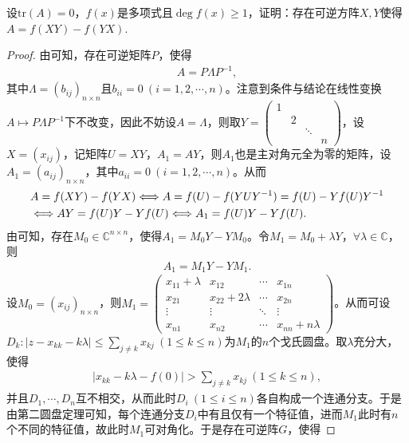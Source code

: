 \documentclass[../../main.tex]{subfiles}
\begin{document}
\begin{proposition}
设$\mathrm{tr}(A)=0$，$f(x)$是多项式且$\deg f(x)\geq 1$，证明：存在可逆方阵$X,Y$使得$A = f(XY)-f(YX)$.
\end{proposition}
\begin{proof}
由可知，存在可逆矩阵$P$，使得
\begin{align*}
A = P\Lambda P^{-1},
\end{align*}
其中$\Lambda = (b_{ij})_{n\times n}$且$b_{ii} = 0\ (i = 1,2,\cdots,n)$。注意到条件与结论在线性变换$A \mapsto P\Lambda P^{-1}$下不改变，因此不妨设$A = \Lambda$，则取$Y = \begin{pmatrix}
1 & & & \\
& 2 & & \\
& & \ddots & \\
& & & n
\end{pmatrix}$，设$X = (x_{ij})$，记矩阵$U = XY$，$A_1 = AY$，则$A_1$也是主对角元全为零的矩阵，设$A_1 = (a_{ij})_{n\times n}$，其中$a_{ii} = 0\ (i = 1,2,\cdots,n)$。从而
\begin{align}
&A = f(XY) - f(YX) \Longleftrightarrow A = f(U) - f(YUY^{-1}) = f(U) - Yf(U)Y^{-1} \notag \\
&\Longleftrightarrow AY = f(U)Y - Yf(U) \Longleftrightarrow A_1 = f(U)Y - Yf(U). \label{100.49}
\end{align}
由可知，存在$M_0 \in \mathbb{C}^{n\times n}$，使得$A_1 = M_0Y - YM_0$。令$M_1 = M_0 + \lambda Y$，$\forall \lambda \in \mathbb{C}$，则
\begin{align}
A_1 = M_1Y - YM_1. \label{100.48}
\end{align}
设$M_0 = (x_{ij})_{n\times n}$，则$M_1 = \begin{pmatrix}
x_{11} + \lambda & x_{12} & \cdots & x_{1n} \\
x_{21} & x_{22} + 2\lambda & \cdots & x_{2n} \\
\vdots & \vdots & \ddots & \vdots \\
x_{n1} & x_{n2} & \cdots & x_{nn} + n\lambda
\end{pmatrix}$。从而可设$D_k: |z - x_{kk} - k\lambda| \leqslant \sum_{j\ne k} x_{kj}\ (1 \leqslant k \leqslant n)$为$M_1$的$n$个戈氏圆盘。取$\lambda$充分大，使得
\begin{align}
|x_{kk} - k\lambda - f(0)| > \sum_{j\ne k} x_{kj}\ (1 \leqslant k \leqslant n), \label{100.46}
\end{align}
并且$D_1, \cdots, D_n$互不相交，从而此时$D_i\ (1 \leqslant i \leqslant n)$各自构成一个连通分支。于是由第二圆盘定理可知，每个连通分支$D_i$中有且仅有一个特征值，进而$M_1$此时有$n$个不同的特征值，故此时$M_1$可对角化。于是存在可逆阵$G$，使得

\end{proof}
\end{document}
